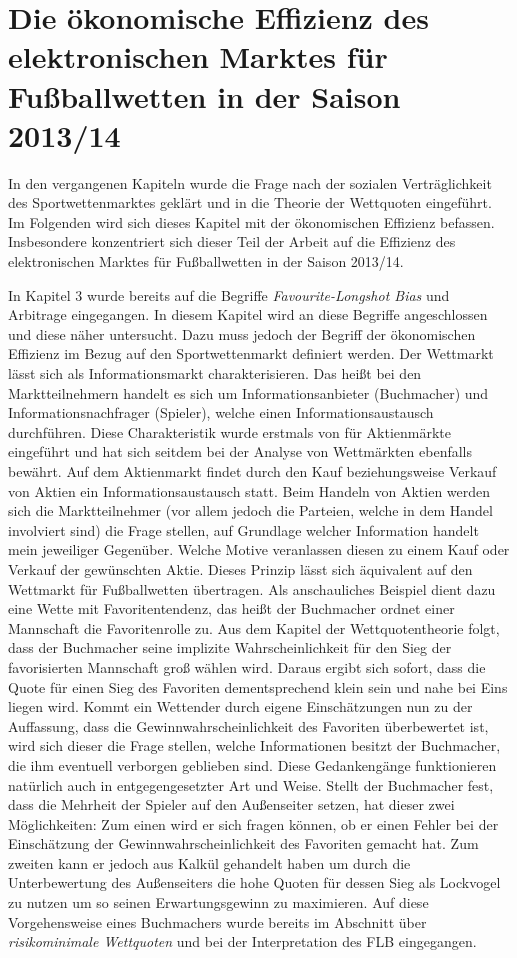 \chapter{Die ökonomische Effizienz des elektronischen Marktes für Fußballwetten in der Saison 2013/14}

In den vergangenen Kapiteln wurde die Frage nach der sozialen Verträglichkeit des Sportwettenmarktes geklärt und in die Theorie der Wettquoten eingeführt. Im Folgenden wird sich dieses Kapitel mit der ökonomischen Effizienz befassen. Insbesondere konzentriert sich dieser Teil der Arbeit auf die Effizienz des elektronischen Marktes für Fußballwetten in der Saison 2013/14. 

In Kapitel 3 wurde bereits auf die Begriffe \textit{Favourite-Longshot Bias} und Arbitrage eingegangen. In diesem Kapitel wird an diese Begriffe angeschlossen und diese näher untersucht. Dazu muss jedoch der Begriff der ökonomischen Effizienz im Bezug auf den Sportwettenmarkt definiert werden. Der Wettmarkt lässt sich als Informationsmarkt charakterisieren. Das heißt bei den Marktteilnehmern handelt es sich um Informationsanbieter (Buchmacher) und Informationsnachfrager (Spieler), welche einen Informationsaustausch durchführen. Diese Charakteristik wurde erstmals von \citet{fama1970efficient} für Aktienmärkte eingeführt und hat sich seitdem bei der Analyse von Wettmärkten ebenfalls bewährt. Auf dem Aktienmarkt findet durch den Kauf beziehungsweise Verkauf von Aktien ein Informationsaustausch statt. Beim Handeln von Aktien werden sich die Marktteilnehmer (vor allem jedoch die Parteien, welche in dem Handel involviert sind) die Frage stellen, auf Grundlage welcher Information handelt mein jeweiliger Gegenüber. Welche Motive veranlassen diesen zu einem Kauf oder Verkauf der gewünschten Aktie. Dieses Prinzip lässt sich äquivalent auf den Wettmarkt für Fußballwetten übertragen. Als anschauliches Beispiel dient dazu eine Wette mit Favoritentendenz, das heißt der Buchmacher ordnet einer Mannschaft die Favoritenrolle zu. Aus dem Kapitel der Wettquotentheorie folgt, dass der Buchmacher seine implizite Wahrscheinlichkeit für den Sieg der favorisierten Mannschaft groß wählen wird. Daraus ergibt sich sofort, dass die Quote für einen Sieg des Favoriten dementsprechend klein sein und nahe bei Eins liegen wird. Kommt ein Wettender durch eigene Einschätzungen nun zu der Auffassung, dass die Gewinnwahrscheinlichkeit des Favoriten überbewertet ist, wird sich dieser die Frage stellen, welche Informationen besitzt der Buchmacher, die ihm eventuell verborgen geblieben sind. Diese Gedankengänge funktionieren natürlich auch in entgegengesetzter Art und Weise. Stellt der Buchmacher fest, dass die Mehrheit der Spieler auf den Außenseiter setzen, hat dieser zwei Möglichkeiten: Zum einen wird er sich fragen können, ob er einen Fehler bei der Einschätzung der Gewinnwahrscheinlichkeit des Favoriten gemacht hat. Zum zweiten kann er jedoch aus Kalkül gehandelt haben um durch die Unterbewertung des Außenseiters die hohe Quoten für dessen Sieg als Lockvogel zu nutzen um so seinen Erwartungsgewinn zu maximieren. Auf diese Vorgehensweise eines Buchmachers wurde bereits im Abschnitt über \textit{risikominimale Wettquoten} und bei der Interpretation des FLB eingegangen.

